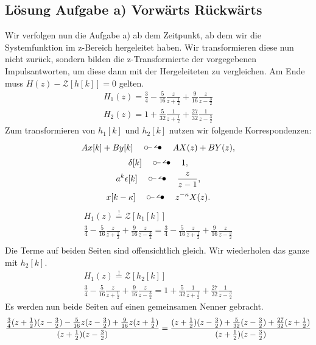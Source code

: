 \documentclass[11pt,a4paper,DIV=12]{scrartcl}
\begin{document}
\subsection*{Lösung Aufgabe a) Vorwärts Rückwärts}
%
Wir verfolgen nun die Aufgabe a) ab dem Zeitpunkt, ab dem wir die 
Systemfunktion im z-Bereich hergeleitet haben. 
%
Wir transformieren diese nun nicht zurück, sondern bilden die z-Transformierte 
der vorgegebenen Impulsantworten, um diese dann mit der Hergeleiteten zu 
vergleichen. 
%
Am Ende muss $H(z)-\mathcal{Z}[h[k]]=0$ gelten.
%
\begin{gather}
	H_1(z)=\frac{3}{4}-\frac{5}{16}\frac{z}{z+\frac{1}{2}}+\frac{9}{16}\frac{z}{z-\frac{3}{2}}\\
	H_2(z)=1+\frac{5}{32}\frac{1}{z+\frac{1}{2}}+\frac{27}{32}\frac{1}{z-\frac{3}{2}}
\end{gather}
%
Zum transformieren von $h_1[k]$ und $h_2[k]$ nutzen wir folgende 
Korrespondenzen:
%
\begin{gather}
	Ax[k]+By[k]\quad\ztransf\quad AX(z)+BY(z),\\
	\delta[k]\quad\ztransf\quad 1,\\
	a^k\epsilon[k]\quad\ztransf\quad \frac{z}{z-1},\\
	x[k-\kappa]\quad\ztransf\quad z^{-\kappa}X(z).
\end{gather}
%
\begin{gather}
	H_1(z)\overset{!}{=}\mathcal{Z}\left[h_1[k]\right]\\
	\frac{3}{4}-\frac{5}{16}\frac{z}{z+\frac{1}{2}}+\frac{9}{16}\frac{z}{z-\frac{3}{2}}
	=\frac{3}{4}-\frac{5}{16}\frac{z}{z+\frac{1}{2}}+\frac{9}{16}\frac{z}{z-\frac{3}{2}}\\
\end{gather}
%
%
Die Terme auf beiden Seiten sind offensichtlich gleich. 
%
Wir wiederholen das ganze mit $h_2[k]$.
%
%
\begin{gather}
	H_1(z)\overset{!}{=}\mathcal{Z}\left[h_2[k]\right]\\
	\frac{3}{4}-\frac{5}{16}\frac{z}{z+\frac{1}{2}}+\frac{9}{16}\frac{z}{z-\frac{3}{2}}
	=1+\frac{5}{32}\frac{1}{z+\frac{1}{2}}+\frac{27}{32}\frac{1}{z-\frac{3}{2}}
\end{gather}
%
%
Es werden nun beide Seiten auf einen gemeinsamen Nenner gebracht.
%
%
\begin{gather}
	\frac{
		\frac{3}{4}(z+\frac{1}{2})(z-\frac{3}{2})-\frac{5}{16}z(z-\frac{3}{2})+\frac{9}{16}z(z+\frac{1}{2})
	}
	{
		(z+\frac{1}{2})(z-\frac{3}{2})
	}
	=\frac{
		(z+\frac{1}{2})(z-\frac{3}{2})+\frac{5}{32}(z-\frac{3}{2})+\frac{27}{32}(z+\frac{1}{2})
	}
	{
		(z+\frac{1}{2})(z-\frac{3}{2})
	}
\end{gather}
\end{document}
